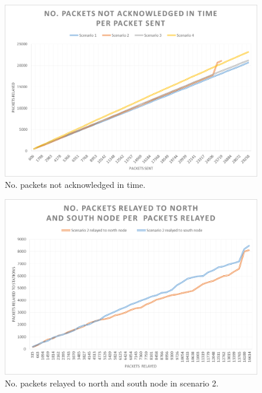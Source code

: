 \begin{figure}[h]
	\centering
	\includegraphics[width=1\linewidth]{results/NoPacketsNotACKInTime}
	\caption{No. packets not acknowledged in time.}
	\label{fig:nopacketsnotackintime}
\end{figure}

\begin{figure}[h]
	\centering
	\includegraphics[width=1\linewidth]{results/NoPacketsRelayedScenario2}
	\caption{No. packets relayed to north and south node in scenario 2.}
	\label{fig:nopacketsrelayedscenario2}
\end{figure}

